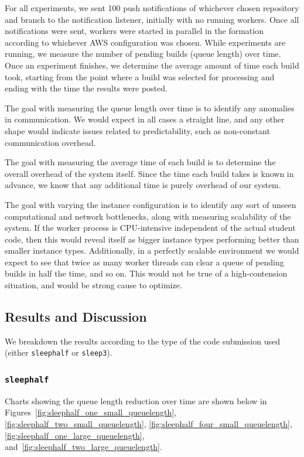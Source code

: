 \documentclass{scrartcl}
\begin{document}
For all experiments, we sent 100 push notifications of whichever chosen repository and branch to the notification listener, initially with no running workers.
Once all notifications were sent, workers were started in parallel in the formation according to whichever AWS configuration was chosen.
While experiments are running, we measure the number of pending builds (queue length) over time.
Once an experiment finishes, we determine the average amount of time each build took, starting from the point where a build was selected for processing and ending with the time the results were posted.

The goal with measuring the queue length over time is to identify any anomalies in communication.
We would expect in all cases a straight line, and any other shape would indicate issues related to predictability, such as non-constant communication overhead.

The goal with measuring the average time of each build is to determine the overall overhead of the system itself.
Since the time each build takes is known in advance, we know that any additional time is purely overhead of our system.

The goal with varying the instance configuration is to identify any sort of unseen computational and network bottlenecks, along with measuring scalability of the system.
If the worker process is CPU-intensive independent of the actual student code, then this would reveal itself as bigger instance types performing better than smaller instance types.
Additionally, in a perfectly scalable environment we would expect to see that twice as many worker threads can clear a queue of pending builds in half the time, and so on.
This would not be true of a high-contension situation, and would be strong cause to optimize.

\subsection{Results and Discussion}
\label{sec:results_discussion}

We breakdown the results according to the type of the code submission used (either \texttt{sleephalf} or \texttt{sleep3}).

\subsubsection{\texttt{sleephalf}}
\label{sec:sleephalf}
Charts showing the queue length reduction over time are shown below in Figures~\ref{fig:sleephalf_one_small_queuelength}, \ref{fig:sleephalf_two_small_queuelength}, \ref{fig:sleephalf_four_small_queuelength}, \ref{fig:sleephalf_one_large_queuelength}, and~\ref{fig:sleephalf_two_large_queuelength}.
\end{document}
